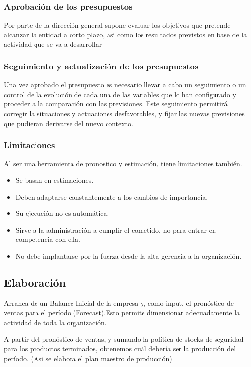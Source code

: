 \documentclass[titlepage,a4paper]{article}
\begin{document}
\subsubsection*{Aprobación de los presupuestos}
Por parte de la dirección general supone evaluar los objetivos que pretende alcanzar la entidad a corto 
plazo, así como los resultados previstos en base de la actividad que se va a desarrollar

\subsubsection*{Seguimiento y actualización de los presupuestos}
Una vez aprobado el presupuesto es necesario llevar a cabo un seguimiento o un control de la evolución 
de cada una de las variables que lo han configurado y proceder a la comparación con las previsiones. Este 
seguimiento permitirá corregir la situaciones y actuaciones desfavorables, y fijar las nuevas previsiones que 
pudieran derivarse del nuevo contexto.

\subsubsection*{Limitaciones}
Al ser una herramienta de pronostico y estimación, tiene limitaciones también.

\begin{itemize}
    \item Se basan en estimaciones.
    \item Deben adaptarse constantemente a los cambios de importancia.
    \item Su ejecución no es automática.
    \item Sirve a la administración a cumplir el cometido, no para entrar en competencia con ella.
    \item No debe implantarse por la fuerza desde la alta gerencia a la organización.
\end{itemize}


\subsection*{Elaboración}
Arranca de un Balance Inicial de la empresa y, como input, el pronóstico de ventas para el período (Forecast).Esto permite dimensionar adecuadamente la actividad de toda la organización.

A partir del pronóstico de ventas, y sumando la política de stocks de seguridad para los productos 
terminados, obtenemos cuál debería ser la producción del período. (Asi se elabora el plan maestro de producción)
\end{document}
